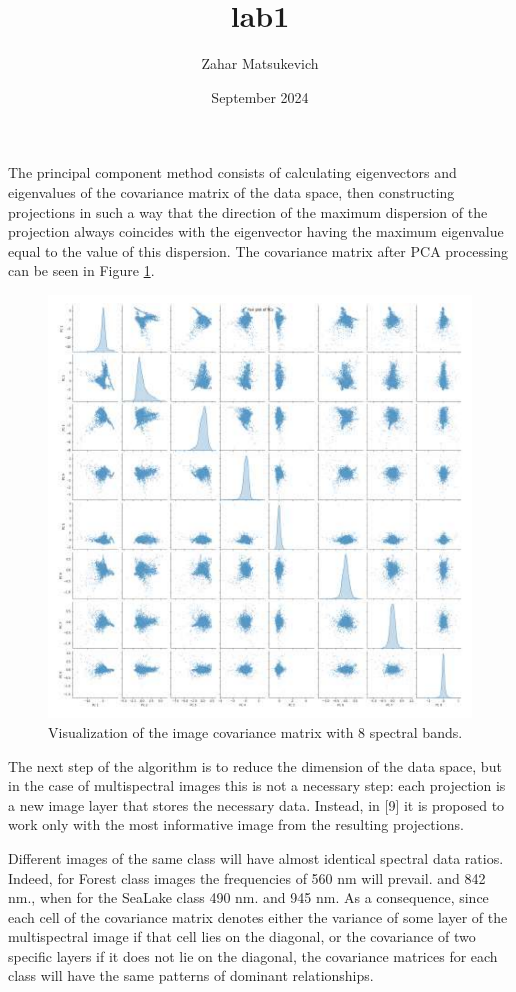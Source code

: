 \documentclass{article}
\title{lab1}
\author{Zahar Matsukevich}
\date{September 2024}
\begin{document}
\fontsize{10}{14}\selectfont
\begin{multicols*}{2}

\par The principal component method consists of calculating 
eigenvectors and eigenvalues of the covariance matrix of 
the data space, then constructing projections in such a way 
that the direction of the maximum dispersion of the projection 
always coincides with the eigenvector having the maximum 
eigenvalue equal to the value of this dispersion. The 
covariance matrix after PCA processing can be seen in Figure \ref{figure4}. 

\begin{figure}[H]
    \centering
    \includegraphics[width=\linewidth]{img4}
    \caption{\small \centering Visualization of the image covariance matrix with 8
    spectral bands. \label{figure4}}
\end{figure}

\par The next step of the algorithm is to reduce the dimension
of the data space, but in the case of multispectral
images this is not a necessary step: each projection
is a new image layer that stores the necessary data.
Instead, in [9] it is proposed to work only with the most
informative image from the resulting projections. 
\par Different images of the same class will have almost
identical spectral data ratios. Indeed, for Forest class
images the frequencies of 560 nm will prevail. and 842
nm., when for the SeaLake class 490 nm. and 945 nm.
As a consequence, since each cell of the covariance
matrix denotes either the variance of some layer of the
multispectral image if that cell lies on the diagonal, or
the covariance of two specific layers if it does not lie on
the diagonal, the covariance matrices for each class will
have the same patterns of dominant relationships. 


\end{multicols*}
\end{document}
